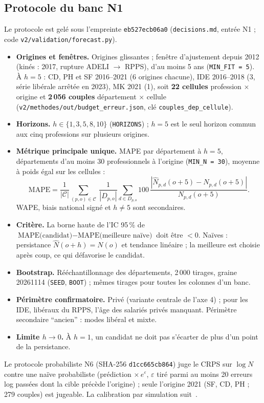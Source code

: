 \subsection{Protocole du banc N1}
\label{met:protocole}
Le protocole est gelé sous l'empreinte \texttt{eb527ecb06a0} (\texttt{decisions.md}, entrée N1 ; code
\texttt{v2/validation/forecast.py}).
\begin{itemize}
  \item \textbf{Origines et fenêtres.} Origines glissantes ; fenêtre d'ajustement depuis 2012 (kinés : 2017,
    rupture ADELI $\to$ RPPS), d'au moins 5 ans (\texttt{MIN\_FIT = 5}). À $h = 5$ : CD, PH et SF 2016--2021
    (6 origines chacune), IDE 2016--2018 (3, série libérale arrêtée en 2023), MK 2021 (1), soit
    \textbf{22 cellules} profession $\times$ origine\mesure{} et \textbf{2\,056 couples} département
    $\times$ cellule\mesure{} (\texttt{v2/methodes/out/budget\_erreur.json}, clé
    \texttt{couples\_dep\_cellule}).
  \item \textbf{Horizons.} $h \in \{1, 3, 5, 8, 10\}$ (\texttt{HORIZONS}) ; $h = 5$ est le seul horizon
    commun aux cinq professions sur plusieurs origines.
  \item \textbf{Métrique principale unique.} MAPE par département à $h = 5$, départements d'au moins 30
    professionnels à l'origine (\texttt{MIN\_N = 30}), moyenne à poids égal sur les cellules :
    \begin{equation}
      \text{MAPE} = \frac{1}{|\mathcal C|}\sum_{(p,o)\in\mathcal C}\ \frac{1}{|D_{p,o}|}\sum_{d \in D_{p,o}}
      100\,\frac{|\hat N_{p,d}(o+5) - N_{p,d}(o+5)|}{N_{p,d}(o+5)} .
    \end{equation}
    WAPE, biais national signé et $h \ne 5$ sont secondaires.
  \item \textbf{Critère.} La borne haute de l'IC 95\,\% de $\text{MAPE(candidat)} - \text{MAPE(meilleure
    naïve)}$ doit être $< 0$. Naïves : persistance $\hat N(o+h) = N(o)$ et tendance linéaire ; la meilleure est
    choisie après coup, ce qui défavorise le candidat.
  \item \textbf{Bootstrap.} Rééchantillonnage des départements, 2\,000 tirages, graine 20261114
    (\texttt{SEED}, \texttt{BOOT}) ; mêmes tirages pour toutes les colonnes d'un banc.
  \item \textbf{Périmètre confirmatoire.} Privé (variante centrale de l'axe 4) ; pour les IDE, libéraux du
    RPPS, l'âge des salariés privés manquant. Périmètre secondaire \enquote{ancien} : modes libéral et mixte.
  \item \textbf{Limite $h \to 0$.} À $h = 1$, un candidat ne doit pas s'écarter de plus d'un point de la
    persistance.
\end{itemize}
Le protocole probabiliste N6 (SHA-256 \texttt{d1cc665cb864}) juge le CRPS sur $\log N$~\cite{b-gneiting2007jasa}
contre une naïve probabiliste (prédiction $\times\,e^{\varepsilon}$, $\varepsilon$ tiré parmi au moins 20
erreurs log passées dont la cible précède l'origine) ; seule l'origine 2021 (SF, CD, PH ; 279 couples\mesure)
est jugeable. La calibration par simulation suit~\cite{b-talts2018sbc}.

